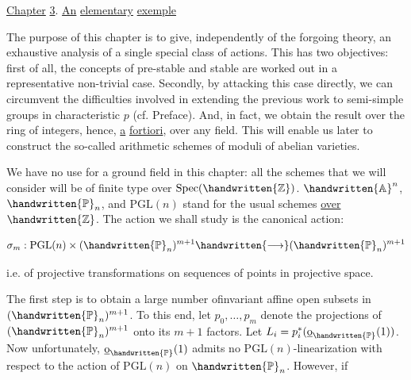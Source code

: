 
\uline{Chapter} \uline{3}. \uline{An} \uline{elementary} \uline{exemple}

The purpose of this chapter is to give, independently of the forgoing theory, an exhaustive analysis of a single special class of actions. This has two objectives: first of all, the concepts of pre-stable and stable are worked out in a representative non-trivial case. Secondly, by attacking this case directly, we can circumvent the difficulties involved in extending the previous work to semi-simple groups in characteristic $p$ (cf. Preface). And, in fact, we obtain the result over the ring of integers, hence, \uline{a} \uline{fortiori}, over any field. This will enable us later to construct the so-called arithmetic schemes of moduli of abelian varieties.

We have no use for a ground field in this chapter: all the schemes that we will consider will be of finite type over $\operatorname{Spec}(\handwritten{\mathbb Z})$. $\handwritten{\mathbb A}^{n}$, $\handwritten{\mathbb P}_n$, and $\mathrm{PGL}(n)$ stand for the usual schemes \uline{over} \uline{$\handwritten{\mathbb Z}$}. The action we shall study is the canonical action:

\[
\sigma_m:\mathrm{PGL}(n)\times(\handwritten{\mathbb P}_n)^{m+1}\handwritten{\longrightarrow}(\handwritten{\mathbb P}_n)^{m+1}
\]

\margin{\handwritten{\unsure{--}}}

i.e. of projective transformations on sequences of points in projective space.

 The first step is to obtain a large number of\handwritten{\unsure{$\mid$}}invariant affine open subsets in $(\handwritten{\mathbb P}_n)^{m+1}$. To this end, let $p_0,\ldots,p_m$ denote the projections of $(\handwritten{\mathbb P}_n)^{m+1}$ onto its $m+1$ factors. Let $L_i=p_i^*(\underline{\mathrm{o}}_{\handwritten{\mathbb P}}(1))$. Now unfortunately, $\underline{\mathrm{o}}_{\handwritten{\mathbb P}}(1)$ admits no $\mathrm{PGL}(n)$-linearization with respect to the action of $\mathrm{PGL}(n)$ on $\handwritten{\mathbb P}_n$. However, if

